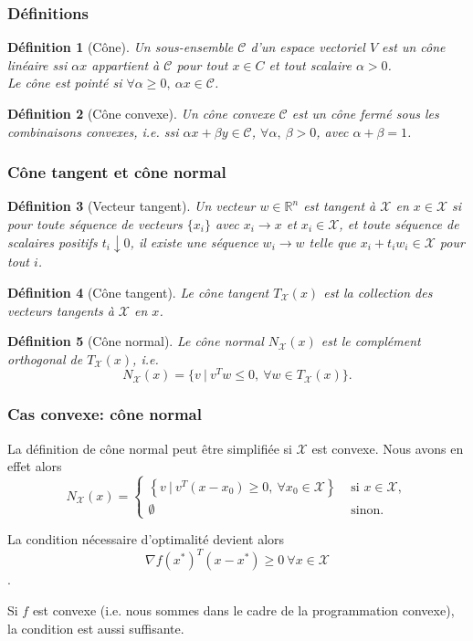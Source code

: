 \documentclass[t,usepdftitle=false]{beamer}
\newtheorem{defn}{Définition}
\def\red{\color{red}}
\def\cC{\mathcal{C}}
\def\cX{\mathcal{X}}
\begin{document}
\begin{frame}
\frametitle{Définitions}

\begin{defn}[Cône]
Un sous-ensemble $\cC$ d'un espace vectoriel $V$ est un {\red cône} linéaire
ssi	$\alpha x$ appartient à $\cC$ pour tout $x \in C$ et tout scalaire $\alpha > 0$.\\
Le cône est pointé si $\forall \alpha \geq 0,\ \alpha x \in \cC$.
\end{defn}

\mbox{}
	
\begin{defn}[Cône convexe]
Un {\red cône convexe} $\cC$ est un cône fermé sous les combinaisons convexes, i.e. ssi $\alpha x + \beta y \in \cC$, $\forall \alpha,\ \beta > 0$, avec $\alpha + \beta = 1$.
\end{defn}

\end{frame}

\begin{frame}
\frametitle{Cône tangent et cône normal}

\begin{defn}[Vecteur tangent]
Un vecteur $w \in \mathbb{R}^n$ est tangent à $\cX$ en $x \in \cX$ si pour toute séquence de vecteurs $\lbrace x_i \rbrace$ avec $x_i \rightarrow x$ et $x_i \in \cX$, et toute séquence de scalaires positifs $t_i \downarrow 0$, il existe une séquence $w_i \rightarrow w$ telle que $x_i + t_iw_i \in \cX$ pour tout $i$.
\end{defn}	
	
\begin{defn}[Cône tangent]
Le {\red cône tangent $T_{\cX}(x)$} est la collection des vecteurs tangents à $\cX$ en $x$.
\end{defn}	

\begin{defn}[Cône normal]
Le {\red cône normal $N_{\cX}(x)$} est le complément orthogonal de $T_{\cX}(x)$, i.e.
\[
N_{\cX}(x) = \lbrace v\ |\ v^Tw \leq 0,\ \forall w \in T_{\cX}(x) \rbrace.
\]
\end{defn}	
	
\end{frame}

\begin{frame}
\frametitle{Cas convexe: cône normal}

La définition de cône normal peut être simplifiée si $\cX$ est convexe.
Nous avons en effet alors
$$
N_{\cX}(x) =
\begin{cases}
\left\lbrace v\ |\ v^T(x-x_0) \geq 0,\ \forall x_0 \in \cX \right\rbrace & \text{\ si\ } x \in \cX,\\
\emptyset & \text{\ sinon.}
\end{cases}
$$
	
\mbox{}

La condition nécessaire d'optimalité devient alors
$$	
\nabla f(x^*)^T (x-x^*) \geq 0\ \forall x \in \cX
$$.
	
	
Si $f$ est convexe (i.e. nous sommes dans le cadre de la programmation convexe), la condition est aussi suffisante.

\end{frame}
\end{document}

